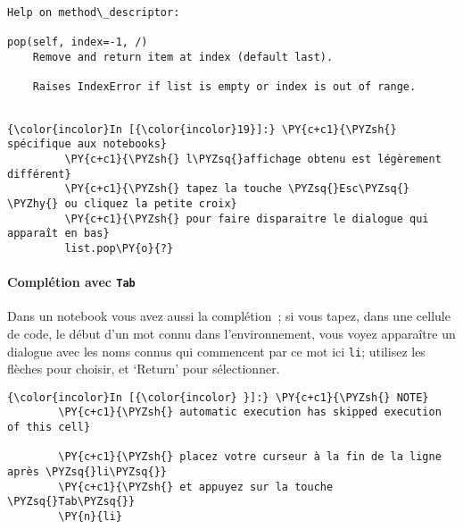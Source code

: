     \begin{Verbatim}[commandchars=\\\{\}]
Help on method\_descriptor:

pop(self, index=-1, /)
    Remove and return item at index (default last).
    
    Raises IndexError if list is empty or index is out of range.


    \end{Verbatim}

    \begin{Verbatim}[commandchars=\\\{\}]
{\color{incolor}In [{\color{incolor}19}]:} \PY{c+c1}{\PYZsh{} spécifique aux notebooks}
         \PY{c+c1}{\PYZsh{} l\PYZsq{}affichage obtenu est légèrement différent}
         \PY{c+c1}{\PYZsh{} tapez la touche \PYZsq{}Esc\PYZsq{} \PYZhy{} ou cliquez la petite croix}
         \PY{c+c1}{\PYZsh{} pour faire disparaitre le dialogue qui apparaît en bas}
         list.pop\PY{o}{?}
\end{Verbatim}


    \hypertarget{compluxe9tion-avec-tab}{%
\paragraph{\texorpdfstring{Complétion avec
\texttt{Tab}}{Complétion avec Tab}}\label{compluxe9tion-avec-tab}}

    Dans un notebook vous avez aussi la complétion~; si vous tapez, dans une
cellule de code, le début d'un mot connu dans l'environnement, vous
voyez apparaître un dialogue avec les noms connus qui commencent par ce
mot ici \texttt{li}; utilisez les flèches pour choisir, et `Return' pour
sélectionner.

    \begin{Verbatim}[commandchars=\\\{\}]
{\color{incolor}In [{\color{incolor} }]:} \PY{c+c1}{\PYZsh{} NOTE}
        \PY{c+c1}{\PYZsh{} automatic execution has skipped execution of this cell}
        
        \PY{c+c1}{\PYZsh{} placez votre curseur à la fin de la ligne après \PYZsq{}li\PYZsq{}}
        \PY{c+c1}{\PYZsh{} et appuyez sur la touche \PYZsq{}Tab\PYZsq{}}
        \PY{n}{li}
\end{Verbatim}



    
    
    
